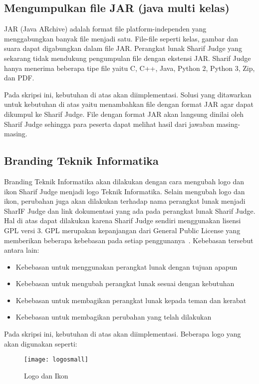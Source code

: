 \subsection{Mengumpulkan file JAR (java multi kelas)}
JAR (Java ARchive) adalah format file platform-independen yang menggabungkan banyak file menjadi satu. File-file seperti kelas, gambar dan suara dapat digabungkan dalam file JAR. Perangkat lunak Sharif Judge yang sekarang tidak mendukung pengumpulan file dengan ekstensi JAR. Sharif Judge hanya menerima beberapa tipe file yaitu C, C++, Java, Python 2, Python 3, Zip, dan PDF.

Pada skripsi ini, kebutuhan di atas akan diimplementasi. Solusi yang ditawarkan untuk kebutuhan di atas yaitu menambahkan file dengan format JAR agar dapat dikumpul ke Sharif Judge. File dengan format JAR akan langsung dinilai oleh Sharif Judge sehingga para peserta dapat melihat hasil dari jawaban masing-masing.

\subsection{Branding Teknik Informatika}
Branding Teknik Informatika akan dilakukan dengan cara mengubah logo dan ikon Sharif Judge menjadi logo Teknik Informatika. Selain mengubah logo dan ikon, perubahan juga akan dilakukan terhadap nama perangkat lunak menjadi SharIF Judge dan link dokumentasi yang ada pada perangkat lunak Sharif Judge. Hal di atas dapat dilakukan karena Sharif Judge sendiri menggunakan lisensi GPL versi 3. GPL merupakan kepanjangan dari General Public License yang memberikan beberapa kebebasan pada setiap penggunanya~\cite{brett:10:moss}.
Kebebasan tersebut antara lain:
	\begin{itemize}
		\item Kebebasan untuk menggunakan perangkat lunak dengan tujuan apapun \\
		\item Kebebasan untuk mengubah perangkat lunak sesuai dengan kebutuhan \\
		\item Kebebasan untuk membagikan perangkat lunak kepada teman dan kerabat \\
		\item Kebebasan untuk membagikan perubahan yang telah dilakukan
	\end{itemize}
Pada skripsi ini, kebutuhan di atas akan diimplementasi. Beberapa logo yang akan digunakan seperti:

\begin{figure}[H]
	\centering  
	\texttt{[image: logosmall]}  
	\caption[Logo dan Ikon]{Logo dan Ikon} 
	\label{fig:logosmall} 
\end{figure} 

